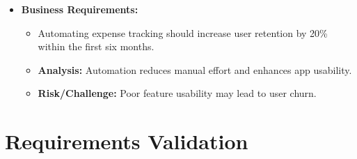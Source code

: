 \begin{itemize}
    \item \textbf{Business Requirements:}
    \begin{itemize}
        \item Automating expense tracking should increase user retention by 20\% within the first six months.
        \item \textbf{Analysis:} Automation reduces manual effort and enhances app usability.
        \item \textbf{Risk/Challenge:} Poor feature usability may lead to user churn.
    \end{itemize}
\end{itemize}



\section{Requirements Validation}

